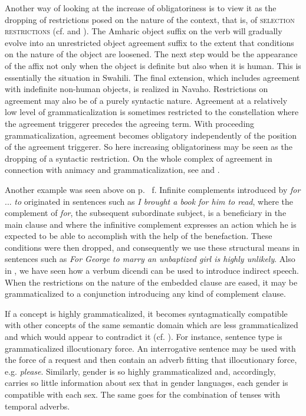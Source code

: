 Another way of looking at the increase of obligatoriness is to view it as the dropping of restrictions posed on the nature of the context, that is, of \textsc{selection restrictions} (cf. \citealt[56]{Vincent1980a} and \citealt[99f]{Serzisko1981}). The Amharic object suffix on the verb will gradually evolve into an unrestricted object agreement suffix to the extent that conditions on the nature of the object are loosened. The next step would be the appearance of the affix not only when the object is definite but also when it is human. This is essentially the situation in Swahili. The final extension, which includes agreement with indefinite non-human objects, is realized in Navaho. Restrictions on agreement may also be of a purely syntactic nature. Agreement at a relatively low level of grammaticalization is sometimes restricted to the constellation where the agreement triggerer precedes the agreeing term. With proceeding grammaticalization, agreement becomes obligatory independently of the position of the agreement triggerer. So here increasing obligatoriness may be seen as the dropping of a syntactic restriction. On the whole complex of agreement in connection with animacy and grammaticalization, see \citet[184f]{Comrie1981b} and \citet[§6.2]{Lehmann1982b}.

Another example was seen above on p.~\pageref{page72}%
f. Infinite complements introduced by \textit{for} ... \textit{to} originated in sentences such as \textit{I brought a book for him to read}, where the complement of \textit{for}, the subsequent subordinate subject, is a beneficiary in the main clause and where the infinitive complement expresses an action which he is expected to be able to accomplish with the help of the benefaction. These conditions were then dropped, and consequently we use these structural means in sentences such as \textit{For George to marry an unbaptized girl is highly unlikely}. Also in , we have seen how a verbum dicendi can be used to introduce indirect speech. When the restrictions on the nature of the embedded clause are eased, it may be grammaticalized to a conjunction introducing any kind of complement clause.\enlargethispage{1\baselineskip}

If a concept is highly grammaticalized, it becomes syntagmatically compatible with other concepts of the same semantic domain which are less grammaticalized and which would appear to contradict it (cf. \citealt[Ch. 15]{Paul1920}). For instance, sentence type is grammaticalized illocutionary force. An interrogative sentence may be used with the force of a request and then contain an adverb fitting that illocutionary force, e.g. \textit{please}. Similarly, gender is so highly grammaticalized and, accordingly, carries so little information about sex that in gender languages, each gender is compatible with each sex. The same goes for the combination of tenses with temporal adverbs.

